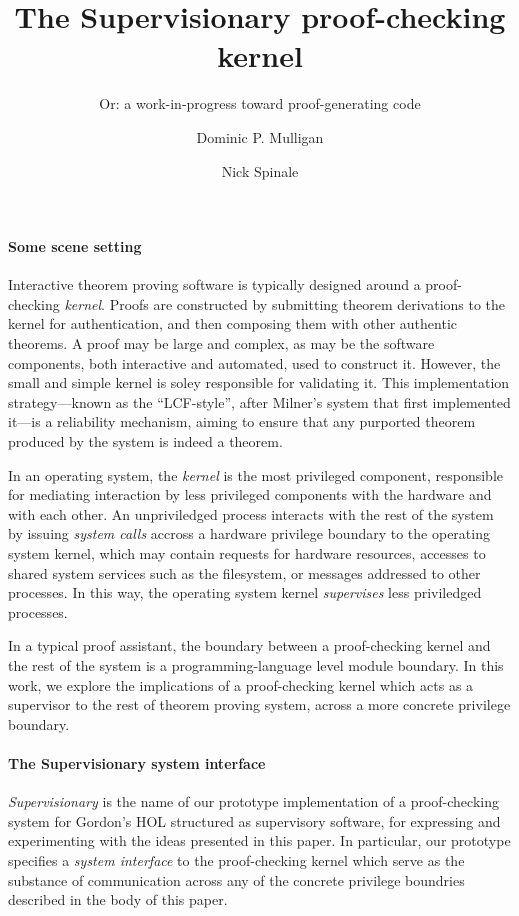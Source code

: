 \documentclass[sigplan, review]{acmart}
\title{The Supervisionary proof-checking kernel}
\subtitle{Or: a work-in-progress toward proof-generating code}
\author{Dominic P. Mulligan}
\affiliation{
  \institution{Systems Research Group, Arm Research}
  \streetaddress{Fulbourn Road}
  \city{Cambridge}
  \country{United Kingdom}
}
\author{Nick Spinale}
\affiliation{
  \institution{Systems Research Group, Arm Research}
  \streetaddress{Fulbourn Road}
  \city{Cambridge}
  \country{United Kingdom}
}
\begin{document}
\maketitle

\paragraph{Some scene setting}

Interactive theorem proving software is typically designed around a proof-checking \emph{kernel}.
Proofs are constructed by submitting theorem derivations to the kernel for authentication, and then composing them with other authentic theorems.
A proof may be large and complex, as may be the software components, both interactive and automated, used to construct it.
However, the small and simple kernel is soley responsible for validating it.
This implementation strategy---known as the ``LCF-style'', after Milner's system that first implemented it---is a reliability mechanism, aiming to ensure that any purported theorem produced by the system is indeed a theorem.

In an operating system, the \emph{kernel} is the most privileged component, responsible for mediating interaction by less privileged components with the hardware and with each other.
An unpriviledged process interacts with the rest of the system by issuing \emph{system calls} accross a hardware privilege boundary to the operating system kernel, which may contain requests for hardware resources, accesses to shared system services such as the filesystem, or messages addressed to other processes.
In this way, the operating system kernel \emph{supervises} less priviledged processes.

In a typical proof assistant, the boundary between a proof-checking kernel and the rest of the system is a programming-language level module boundary.
In this work, we explore the implications of a proof-checking kernel which acts as a supervisor to the rest of theorem proving system, across a more concrete privilege boundary.

\paragraph{The Supervisionary system interface}

\emph{Supervisionary} is the name of our prototype implementation of a proof-checking system for Gordon's HOL structured as supervisory software, for expressing and experimenting with the ideas presented in this paper.
In particular, our prototype specifies a \emph{system interface} to the proof-checking kernel which serve as the substance of communication across any of the concrete privilege boundries described in the body of this paper.
\end{document}
